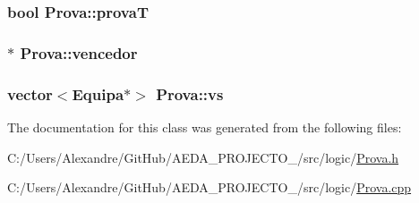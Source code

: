 \subsubsection[{prova\+T}]{\setlength{\rightskip}{0pt plus 5cm}bool Prova\+::prova\+T\hspace{0.3cm}{\ttfamily [private]}}\label{class_prova_a9b551ecafa591456d49345ceb9ea790d}
\hypertarget{class_prova_a9da09789da7cc0ef43b38197c96558fc}{}
\subsubsection[{vencedor}]{$\ast$ Prova\+::vencedor\hspace{0.3cm}{\ttfamily [private]}}\label{class_prova_a9da09789da7cc0ef43b38197c96558fc}
\hypertarget{class_prova_aa085e9c4905e762142b6b735f4dfda30}{}
\subsubsection[{vs}]{\setlength{\rightskip}{0pt plus 5cm}vector$<${\bf Equipa}$\ast$$>$ Prova\+::vs\hspace{0.3cm}{\ttfamily [private]}}\label{class_prova_aa085e9c4905e762142b6b735f4dfda30}


The documentation for this class was generated from the following files\+:\begin{DoxyCompactItemize}
\item 
C\+:/\+Users/\+Alexandre/\+Git\+Hub/\+A\+E\+D\+A\+\_\+\+P\+R\+O\+J\+E\+C\+T\+O\+\_/src/logic/\hyperlink{_prova_8h}{Prova.\+h}\item 
C\+:/\+Users/\+Alexandre/\+Git\+Hub/\+A\+E\+D\+A\+\_\+\+P\+R\+O\+J\+E\+C\+T\+O\+\_/src/logic/\hyperlink{_prova_8cpp}{Prova.\+cpp}\end{DoxyCompactItemize}

